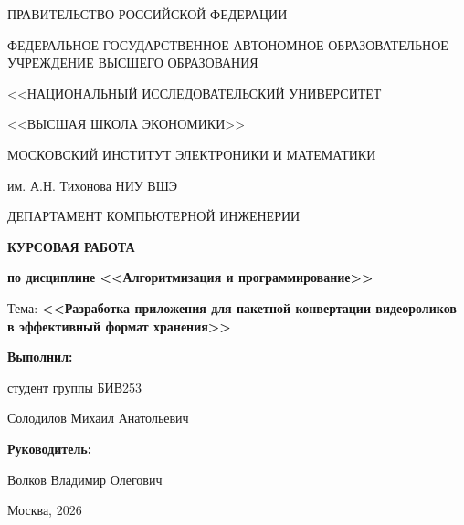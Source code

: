 \documentclass[14pt,a4paper]{extarticle}
\begin{document}
\begin{titlepage}
	\thispagestyle{empty}
	\setlength{\parindent}{0pt}
	\begin{center}
		ПРАВИТЕЛЬСТВО РОССИЙСКОЙ ФЕДЕРАЦИИ

		ФЕДЕРАЛЬНОЕ ГОСУДАРСТВЕННОЕ АВТОНОМНОЕ ОБРАЗОВАТЕЛЬНОЕ УЧРЕЖДЕНИЕ ВЫСШЕГО ОБРАЗОВАНИЯ

		<<НАЦИОНАЛЬНЫЙ ИССЛЕДОВАТЕЛЬСКИЙ УНИВЕРСИТЕТ

		<<ВЫСШАЯ ШКОЛА ЭКОНОМИКИ>>

		\vspace{1.2\baselineskip}

		МОСКОВСКИЙ ИНСТИТУТ ЭЛЕКТРОНИКИ И МАТЕМАТИКИ

		им. А.Н. Тихонова НИУ ВШЭ

		\vspace{1.2\baselineskip}

		ДЕПАРТАМЕНТ КОМПЬЮТЕРНОЙ ИНЖЕНЕРИИ

		\vspace{2.6\baselineskip}

		\textbf{КУРСОВАЯ РАБОТА}

		\textbf{по дисциплине <<Алгоритмизация и программирование>>}

		\vspace{1.2\baselineskip}

		Тема: \textbf{<<Разработка приложения для пакетной конвертации видеороликов в эффективный формат хранения>>}
	\end{center}

	\vspace{3.5\baselineskip}

	\begin{flushright}
		\textbf{Выполнил:}

		студент группы БИВ253

		Солодилов Михаил Анатольевич

		\vspace{1.2\baselineskip}

		\textbf{Руководитель:}

		Волков Владимир Олегович
	\end{flushright}

	\vfill

	\begin{center}
		Москва, 2026
	\end{center}
\end{titlepage}

\setcounter{page}{2}
\justifying
\onehalfspacing
\end{document}
